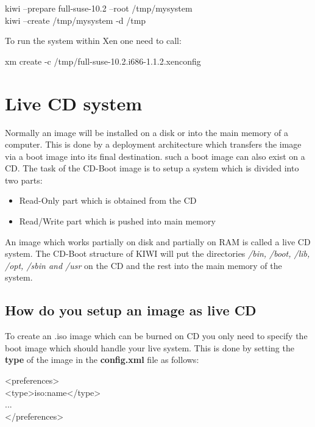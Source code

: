 \begin{Command}{14cm}
    kiwi --prepare full-suse-10.2 --root /tmp/mysystem\\
    kiwi --create /tmp/mysystem -d /tmp
\end{Command}

To run the system within Xen one need to call:

\begin{Command}{14cm}
   xm create -c /tmp/full-suse-10.2.i686-1.1.2.xenconfig
\end{Command}

\section{Live CD system}
Normally an image will be installed on a disk or into the
main memory of a computer. This is done by a deployment
architecture which transfers the image via a boot image
into its final destination. such a boot image can also
exist on a CD. The task of the CD-Boot image is to setup
a system which is divided into two parts:

\begin{itemize}
	\item Read-Only part which is obtained from the CD
	\item Read/Write part which is pushed into main memory
\end{itemize}

An image which works partially on disk and partially on RAM
is called a live CD system. The CD-Boot structure of KIWI will
put the directories \textit{/bin, /boot, /lib, /opt, /sbin and /usr}
on the CD and the rest into the main memory of the system.

\subsection{How do you setup an image as live CD}
To create an .iso image which can be burned on CD you only need
to specify the boot image which should handle your live system.
This is done by setting the \textbf{type} of the image in the
\textbf{config.xml} file as follows:

\begin{Command}{9cm}
<preferences>\\
\hspace*{1cm}<type>iso:name</type>\\
\hspace*{1cm}...\\
</preferences>
\end{Command}

